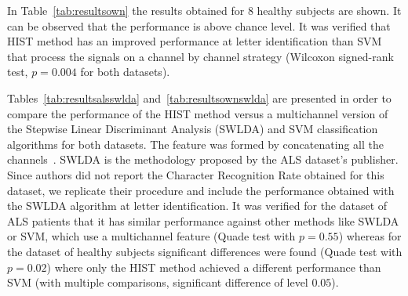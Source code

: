 \documentclass[utf8]{frontiersSCNS} %
\begin{document}
In Table~\ref{tab:resultsown} the results obtained for 8 healthy subjects are shown.  It can be observed that the performance is above chance level. It was verified that HIST method has an improved performance at letter identification than SVM that process the signals on a channel by channel strategy (Wilcoxon signed-rank test, $p =  0.004$ for both datasets).



Tables~\ref{tab:resultsalsswlda} and~\ref{tab:resultsownswlda} are presented in order to compare the performance of the HIST method versus a multichannel version of the Stepwise Linear Discriminant Analysis (SWLDA) and SVM classification algorithms for both datasets.  The feature was formed by concatenating all the channels~\citep{Krusienski2006}.  SWLDA is the methodology proposed by the ALS dataset's publisher. Since authors \cite{Riccio2013} did not report the Character Recognition Rate obtained for this dataset, we replicate their procedure and include the performance obtained with the SWLDA algorithm at letter identification.  It was verified for the dataset of ALS patients that it has similar performance  against other methods like SWLDA or SVM, which use a multichannel feature (Quade test with $p=0.55$) whereas for the dataset of healthy subjects significant differences were found (Quade test with $p=0.02$) where only the HIST method achieved a different performance than SVM (with multiple comparisons, significant difference of level $0.05$).

 
\end{document}
